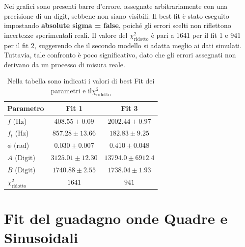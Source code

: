 \documentclass[10pt,a4paper]{article}
\begin{document}
Nei grafici sono presenti barre d’errore, assegnate arbitrariamente con una precisione di un digit, sebbene non siano visibili. Il best fit è stato eseguito impostando \textbf{absolute sigma = false}, poiché gli errori scelti non riflettono incertezze sperimentali reali. Il valore del \(\chi^2_{\text{ridotto}}\) è pari a 1641 per il fit 1 e 941 per il fit 2, suggerendo che il secondo modello si adatta meglio ai dati simulati. Tuttavia, tale confronto è poco significativo, dato che gli errori assegnati non derivano da un processo di misura reale.

\bigskip
\begin{table}[h!]
    \centering
    \begin{tabular}{lcc}
        \hline\hline
        \textbf{Parametro} & \textbf{Fit 1} & \textbf{Fit 3} \\
        \hline
        $f$ (Hz)        & $408.55 \pm 0.09$    & $2002.44 \pm 0.97$ \\
        $f_t$ (Hz)      & $857.28 \pm 13.66$   & $182.83 \pm 9.25$ \\
        $\phi$ (rad)    & $0.030 \pm 0.007$     & $0.410 \pm 0.048$ \\
        $A$ (Digit)     & $3125.01 \pm 12.30$   & $13794.0 \pm 6912.4$ \\
        $B$ (Digit)     & $1740.88 \pm 2.55$    & $1738.04 \pm 1.93$ \\
        $\chi^2_{\text{ridotto}}$ & $1641$  & $941$ \\
        \hline\hline
    \end{tabular}
    \caption{ Nella tabella sono indicati i valori di best Fit dei parametri e il\( \chi^2_{\text{ridotto}} \)}
    \label{tab:pt}
\end{table}
\newpage

\section{Fit del guadagno onde Quadre e Sinusoidali}
\end{document}
